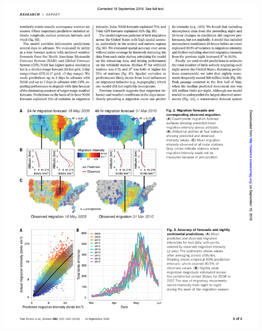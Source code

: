 \documentclass[a4paper, twoside]{templates/ociamthesis}
\begin{document}
\begin{center}\includegraphics[width=1\linewidth]{pdf_chapters/forecast/forecast_crop_Part2} \end{center}
\end{document}
